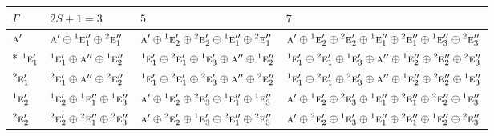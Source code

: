 \documentclass[10pt,a4paper]{article}
\numberwithin{equation}{section}
\newcommand{\irr}[1]{\text{\normalfont\scshape #1}}
\newcommand{\conjpair}[1]{{}^{#1}}
\begin{document}
{\small\setlength{\tabcolsep}{3pt}\begin{longtable}{@{}l>{\RaggedRight\arraybackslash}p{}>{\RaggedRight\arraybackslash}p{}>{\RaggedRight\arraybackslash}p{}@{}}\toprule
$\Gamma$ & $2S + 1 = 3$ & $5$ & $7$\\\midrule\endhead
\bottomrule\endfoot\endlastfoot
$\irr{a}'$ & $\irr{a}'\oplus \conjpair{1}\irr{e}_{1}''\oplus \conjpair{2}\irr{e}_{1}''$ & $\irr{a}'\oplus \conjpair{1}\irr{e}_{2}'\oplus \conjpair{2}\irr{e}_{2}'\oplus \conjpair{1}\irr{e}_{1}''\oplus \conjpair{2}\irr{e}_{1}''$ & $\irr{a}'\oplus \conjpair{1}\irr{e}_{2}'\oplus \conjpair{2}\irr{e}_{2}'\oplus \conjpair{1}\irr{e}_{1}''\oplus \conjpair{2}\irr{e}_{1}''\oplus \conjpair{1}\irr{e}_{3}''\oplus \conjpair{2}\irr{e}_{3}''$\\*
$\conjpair{1}\irr{e}_{1}'$ & $\conjpair{1}\irr{e}_{1}'\oplus \irr{a}''\oplus \conjpair{1}\irr{e}_{2}''$ & $\conjpair{1}\irr{e}_{1}'\oplus \conjpair{2}\irr{e}_{1}'\oplus \conjpair{1}\irr{e}_{3}'\oplus \irr{a}''\oplus \conjpair{1}\irr{e}_{2}''$ & $\conjpair{1}\irr{e}_{1}'\oplus \conjpair{2}\irr{e}_{1}'\oplus \conjpair{1}\irr{e}_{3}'\oplus \irr{a}''\oplus \conjpair{1}\irr{e}_{2}''\oplus \conjpair{2}\irr{e}_{2}''\oplus \conjpair{2}\irr{e}_{3}''$\\
$\conjpair{2}\irr{e}_{1}'$ & $\conjpair{2}\irr{e}_{1}'\oplus \irr{a}''\oplus \conjpair{2}\irr{e}_{2}''$ & $\conjpair{1}\irr{e}_{1}'\oplus \conjpair{2}\irr{e}_{1}'\oplus \conjpair{2}\irr{e}_{3}'\oplus \irr{a}''\oplus \conjpair{2}\irr{e}_{2}''$ & $\conjpair{1}\irr{e}_{1}'\oplus \conjpair{2}\irr{e}_{1}'\oplus \conjpair{2}\irr{e}_{3}'\oplus \irr{a}''\oplus \conjpair{1}\irr{e}_{2}''\oplus \conjpair{2}\irr{e}_{2}''\oplus \conjpair{1}\irr{e}_{3}''$\\
$\conjpair{1}\irr{e}_{2}'$ & $\conjpair{1}\irr{e}_{2}'\oplus \conjpair{1}\irr{e}_{1}''\oplus \conjpair{1}\irr{e}_{3}''$ & $\irr{a}'\oplus \conjpair{1}\irr{e}_{2}'\oplus \conjpair{2}\irr{e}_{3}'\oplus \conjpair{1}\irr{e}_{1}''\oplus \conjpair{1}\irr{e}_{3}''$ & $\irr{a}'\oplus \conjpair{1}\irr{e}_{2}'\oplus \conjpair{2}\irr{e}_{3}'\oplus \conjpair{1}\irr{e}_{1}''\oplus \conjpair{2}\irr{e}_{1}''\oplus \conjpair{2}\irr{e}_{2}''\oplus \conjpair{1}\irr{e}_{3}''$\\
$\conjpair{2}\irr{e}_{2}'$ & $\conjpair{2}\irr{e}_{2}'\oplus \conjpair{2}\irr{e}_{1}''\oplus \conjpair{2}\irr{e}_{3}''$ & $\irr{a}'\oplus \conjpair{2}\irr{e}_{2}'\oplus \conjpair{1}\irr{e}_{3}'\oplus \conjpair{2}\irr{e}_{1}''\oplus \conjpair{2}\irr{e}_{3}''$ & $\irr{a}'\oplus \conjpair{2}\irr{e}_{2}'\oplus \conjpair{1}\irr{e}_{3}'\oplus \conjpair{1}\irr{e}_{1}''\oplus \conjpair{2}\irr{e}_{1}''\oplus \conjpair{1}\irr{e}_{2}''\oplus \conjpair{2}\irr{e}_{3}''$\\

\end{longtable}}
\end{document}
